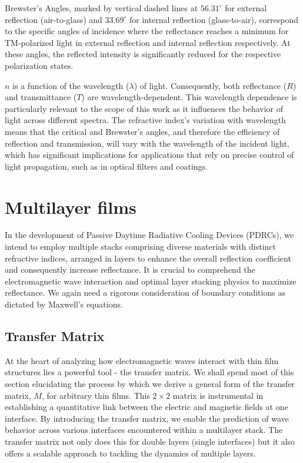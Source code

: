 Brewster's Angles, marked by vertical dashed lines at \(56.31^\circ\) for external reflection (air-to-glass) and \(33.69^\circ\) for internal reflection (glass-to-air), correspond to the specific angles of incidence where the reflectance reaches a minimum for TM-polarized light in external reflection and internal reflection respectively. At these angles, the reflected intensity is significantly reduced for the respective polarization states.

$n$ is a function of the wavelength ($\lambda$) of light. Consequently, both reflectance ($R$) and transmittance ($T$) are wavelength-dependent. This wavelength dependence is particularly relevant to the scope of this work as it influences the behavior of light across different spectra. The refractive index’s variation with wavelength means that the critical and Brewster's angles, and therefore the efficiency of reflection and transmission, will vary with the wavelength of the incident light, which has significant implications for applications that rely on precise control of light propagation, such as in optical filters and coatings.

\section{Multilayer films}
In the development of Passive Daytime Radiative Cooling Devices (PDRCs), we intend to employ multiple stacks comprising diverse materials with distinct refractive indices, arranged in layers to enhance the overall reflection coefficient and consequently increase reflectance. It is crucial to comprehend the electromagnetic wave interaction and optimal layer stacking physics to maximize reflectance. We again need a rigorous consideration of boundary conditions as dictated by Maxwell's equations.

\subsection{Transfer Matrix}

At the heart of analyzing how electromagnetic waves interact with thin film structures lies a powerful tool - the transfer matrix. We shall spend most of this section elucidating the process by which we derive a general form of the transfer matrix, $M$, for arbitrary thin films. This $2 \times 2$ matrix is instrumental in establishing a quantitative link between the electric and magnetic fields at one interface. By introducing the transfer matrix, we enable the prediction of wave behavior across various interfaces encountered within a multilayer stack. The transfer matrix not only does this for double layers (single interfaces) but it also offers a scalable approach to tackling the dynamics of multiple layers.

